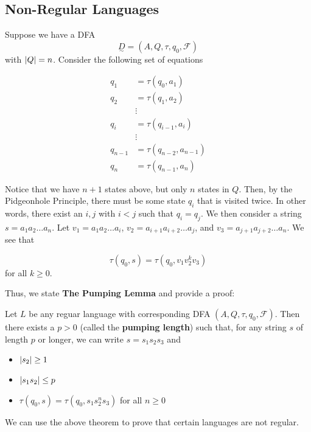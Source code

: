 \subsection{Non-Regular Languages}\label{subsubsec:non-regular-languages}
Suppose we have a DFA \[\underset{\sim}{D}=(A, Q, \tau, q_0, \mathcal{F})\] with \(\abs{Q}=n\). Consider the following set of equations

\begin{align*}
      q_1 &= \tau(q_0, a_1)\\
      q_2 &= \tau(q_1, a_2)\\
          &\vdots \\
      q_i &= \tau(q_{i-1}, a_i)\\
          &\vdots \\
      q_{n-1} &= \tau(q_{n-2}, a_{n-1})\\
      q_n &= \tau(q_{n-1}, a_n)
\end{align*}

Notice that we have \(n+1\) states above, but only \(n\) states in \(Q\). Then, by the Pidgeonhole Principle, there must be some state \(q_i\) that is visited twice. In other words, there exist an \(i, j\) with \(i < j\) such that \(q_i=q_j\). We then consider a string \(s=a_1a_2\hdots a_n\). Let \(v_1=a_1a_2\hdots a_i\), \(v_2=a_{i+1}a_{i+2}\hdots a_j\), and \(v_3=a_{j+1}a_{j+2}\hdots a_n\). We see that 

\[\tau(q_0, s)=\tau(q_0, v_1v_2^k v_3)\] for all \(k\geq0\). 

\begin{center}
\end{center}

Thus, we state \textbf{The Pumping Lemma} and provide a proof:

\begin{theorem}
      Let \( L \) be any reguar language with corresponding DFA \((A, Q, \tau, q_0, \mathcal{F})\). Then there exists a \(p>0\) (called the \textbf{pumping length}) such that, for any string \(s\) of length \(p\) or longer, we can write \(s=s_1s_2s_3\) and
      \begin{itemize}
            \item \(\abs{s_2}\geq 1\)
            \item \(\abs{s_1s_2}\leq p\)
            \item \(\tau(q_0, s)=\tau(q_0, s_1s_2^n s_3)\) for all \(n\geq0\)
      \end{itemize}
\end{theorem}
We can use the above theorem to prove that certain languages are not regular. 

